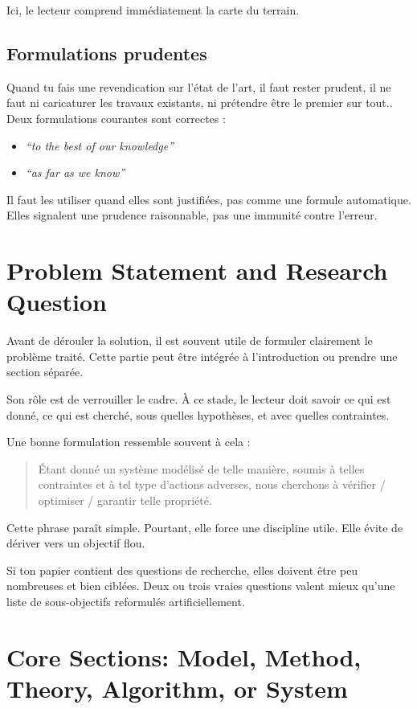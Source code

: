 \documentclass[11pt,a4paper]{article}
\theoremstyle{definition}
\begin{document}
Ici, le lecteur comprend immédiatement la carte du terrain.

\subsection*{Formulations prudentes}

Quand tu fais une revendication sur l'état de l'art, il faut rester prudent, il ne faut ni caricaturer les travaux existants, ni prétendre être le premier sur tout.. Deux formulations courantes sont correctes :
\begin{itemize}
    \item \textit{``to the best of our knowledge''}
    \item \textit{``as far as we know''}
\end{itemize}

Il faut les utiliser quand elles sont justifiées, pas comme une formule automatique. Elles signalent une prudence raisonnable, pas une immunité contre l'erreur.


\section{Problem Statement and Research Question}

Avant de dérouler la solution, il est souvent utile de formuler clairement le problème traité. Cette partie peut être intégrée à l'introduction ou prendre une section séparée.

Son rôle est de verrouiller le cadre. À ce stade, le lecteur doit savoir ce qui est donné, ce qui est cherché, sous quelles hypothèses, et avec quelles contraintes.

Une bonne formulation ressemble souvent à cela :
\begin{quote}
Étant donné un système modélisé de telle manière, soumis à telles contraintes et à tel type d'actions adverses, nous cherchons à vérifier / optimiser / garantir telle propriété.
\end{quote}

Cette phrase paraît simple. Pourtant, elle force une discipline utile. Elle évite de dériver vers un objectif flou.

Si ton papier contient des questions de recherche, elles doivent être peu nombreuses et bien ciblées. Deux ou trois vraies questions valent mieux qu'une liste de sous-objectifs reformulés artificiellement.

\section{Core Sections: Model, Method, Theory, Algorithm, or System}
\end{document}
